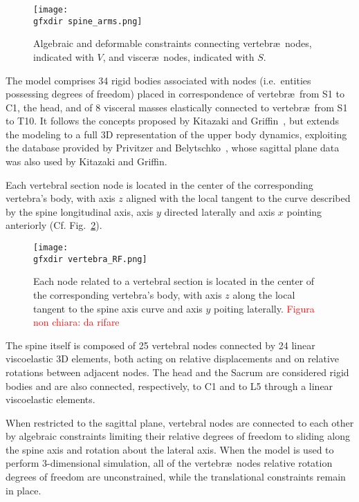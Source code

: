 \begin{figure}[htbp]
  \centering
  \hfil
  \texttt{[image: \\gfxdir spine\_arms.png]}
  \hfil
  \def\svgwidth{.3\textwidth}
  
  \hfil
  \def\svgwidth{.3\textwidth}
   
  \hfil
  \caption{Algebraic and deformable constraints connecting vertebr\ae\ nodes, indicated with
    	$V$, and viscer\ae\ nodes, indicated with $S$.}
  \label{fig:example}
\end{figure}

The model comprises 34 rigid bodies associated with nodes (i.e.\ entities
possessing degrees of freedom) placed in correspondence of vertebr\ae\ from S1 to C1, the
head, and of 8 visceral masses elastically connected to vertebr\ae\ from S1 to T10.
It follows the concepts proposed by Kitazaki and Griffin~\cite{KITAZAKI1997},
but extends the modeling to a full 3D representation of the upper body dynamics,
exploiting the database provided by Privitzer and
Belytschko~\cite{BELYTSCHKO-1978-AF-33615-76-C-0506}, whose sagittal plane data
was also used by Kitazaki and Griffin. 

Each vertebral section node is located in the center of the corresponding
vertebra's body, with axis $z$ aligned with the local tangent to the curve
described by the spine longitudinal axis, axis $y$ directed laterally and axis
$x$ pointing anteriorly (Cf. Fig.~\ref{fig:vertebra_RF}).

\begin{figure}[htbp]
	\centering
	\texttt{[image: \\gfxdir vertebra\_RF.png]}
	\caption{Each node related to a vertebral section is located in the
	center of the corresponding vertebra's body, with axis $z$ along the
	local tangent to the spine axis curve and axis $y$ poiting laterally.
	\textcolor{red}{Figura non chiara: da rifare}}
	\label{fig:vertebra_RF}
\end{figure}

The spine itself is composed of 25 vertebral nodes connected by 24 linear
viscoelastic 3D elements, both acting on relative displacements and on relative
rotations between adjacent nodes. The head and the Sacrum are considered rigid
bodies and are also connected, respectively, to C1 and to L5 through a linear
viscoelastic elements. 

When restricted to the sagittal plane, vertebral nodes are connected to each other by
algebraic constraints limiting their relative degrees of freedom to sliding along the
spine axis and rotation about the lateral axis. When the model is used to perform
3-dimensional simulation, all of the vertebr\ae\ nodes relative rotation degrees of freedom
are unconstrained, while the translational constraints remain in place. 

